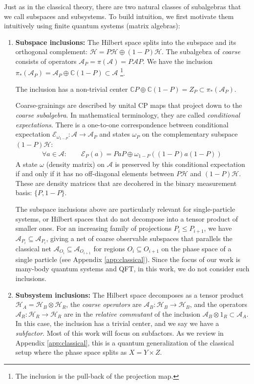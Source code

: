 \documentclass[a4paper,11pt]{article}
\theoremstyle{definition}
\newcommand{\mA}{\mathcal{A}}
\newcommand{\mH}{\mathcal{H}}
\newcommand{\mE}{\mathcal{E}}
\begin{document}
Just as in the classical theory, there are two natural classes of subalgebras that we call subspaces and subsystems. To build intuition, we first motivate them intuitively using finite quantum systems (matrix algebras):
\begin{enumerate}
    \item {\bf Subspace inclusions:} The Hilbert space splits into the subspace and its orthogonal complement: $\mH=P\mH\oplus(1-P)\mH$. The subalgebra of {\it coarse} consists of operators $\mA_P=\pi(\mA)=P\mA P$. We have the inclusion $\pi_*(\mA_P)=\mA_P\oplus \mathbb{C}(1-P)\subset \mA$ \footnote{The inclusion is the pull-back of the projection map.}.
    
    The inclusion has a non-trivial center $\mathbb{C}P\oplus \mathbb{C}(1-P)=Z_P\subset \pi_*(\mA_P)$.
    
    Coarse-grainings are described by unital CP maps that project down to the {\it coarse subalgebra}. In mathematical terminology, they are called {\it conditional expectations}. There is a one-to-one correspondence between conditional expectation $\mE_{\omega_{1-P}}:\mA\to \mA_P$ and states $\omega_P$ on the complementary subspace $(1-P)\mH$:
    \begin{align}
    \forall a\in \mA:\qquad \mE_P(a)=Pa P\oplus \omega_{1-P}((1-P)a(1-P))\   
    \end{align}
A state $\omega$ (density matrix) on $\mA$ is preserved by this conditional expectation if and only if it has no off-diagonal elements between $P\mH$ and $(1-P)\mH$. These are density matrices that are decohered in the binary measurement basis: $\{P,1-P\}$. 
    
The subspace inclusions above are particularly relevant for single-particle systems, or Hilbert spaces that do not decompose into a tensor product of smaller ones. For an increasing family of projections $P_i\leq P_{i+1}$, we have
$\mathcal{A}_{P_i}\subseteq\mathcal{A}_{P_i}$, giving a net of coarse observable subspaces that parallels the classical net $\mathcal{A}_{O_i}\subseteq\mathcal{A}_{O_{i+1}}$ for regions
$O_i\subseteq O_{i+1}$ on the phase space of a single particle (see Appendix \ref{app:classical}). Since the focus of our work is many-body quantum systems and QFT, in this work, we do not consider such inclusions.

\item {\bf Subsystem inclusions:} The Hilbert space decomposes as a tensor product $\mH_A=\mH_B\otimes \mH_R$, the {\it coarse operators} are $\mA_B:\mH_B\to \mH_B$, and the operators $\mA_R:\mH_R\to \mH_R$ are in the {\it relative commutant} of the inclusion $\mA_B\otimes 1_R\subset \mA_A$. In this case, the inclusion has a trivial center, and we say we have a {\it subfactor}. Most of this work will focus on subfactors. As we review in Appendix \ref{app:classical}, this is a quantum generalization of the classical setup where the phase space splits as $X=Y\times Z$. 


\end{enumerate}
\end{document}
